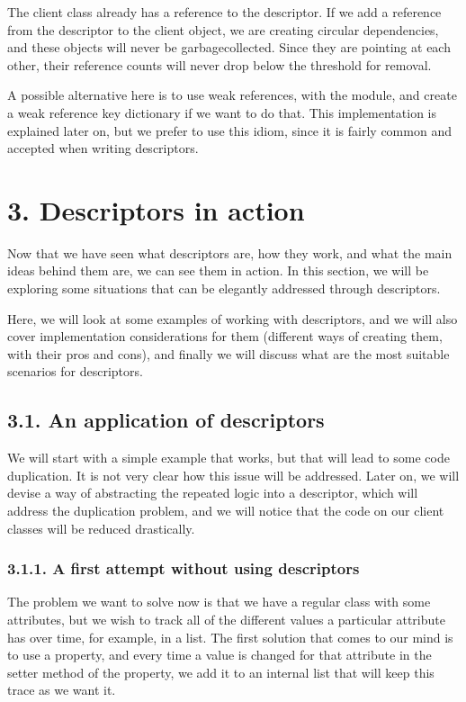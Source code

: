 \documentclass[a4paper,10pt,english]{sphinxmanual}
\begin{document}
The client class already has a reference to the descriptor. If we add a reference from the
descriptor to the client object, we are creating circular dependencies, and these objects
will never be garbage\sphinxhyphen{}collected. Since they are pointing at each other, their reference counts
will never drop below the threshold for removal.

A possible alternative here is to use weak references, with the  module, and create
a weak reference key dictionary if we want to do that. This implementation is explained
later on, but we prefer to use this idiom, since it is fairly common and accepted when writing descriptors.


\section{3. Descriptors in action}
\label{\detokenize{chapters/6_descriptors/index:descriptors-in-action}}
Now that we have seen what descriptors are, how they work, and what the main ideas
behind them are, we can see them in action. In this section, we will be exploring some
situations that can be elegantly addressed through descriptors.

Here, we will look at some examples of working with descriptors, and we will also cover
implementation considerations for them (different ways of creating them, with their pros
and cons), and finally we will discuss what are the most suitable scenarios for descriptors.


\subsection{3.1. An application of descriptors}
\label{\detokenize{chapters/6_descriptors/index:an-application-of-descriptors}}
We will start with a simple example that works, but that will lead to some code duplication.
It is not very clear how this issue will be addressed. Later on, we will devise a way of
abstracting the repeated logic into a descriptor, which will address the duplication
problem, and we will notice that the code on our client classes will be reduced drastically.


\subsubsection{3.1.1. A first attempt without using descriptors}
\label{\detokenize{chapters/6_descriptors/index:a-first-attempt-without-using-descriptors}}
The problem we want to solve now is that we have a regular class with some attributes, but
we wish to track all of the different values a particular attribute has over time, for example,
in a list. The first solution that comes to our mind is to use a property, and every time a
value is changed for that attribute in the setter method of the property, we add it to an
internal list that will keep this trace as we want it.
\end{document}
